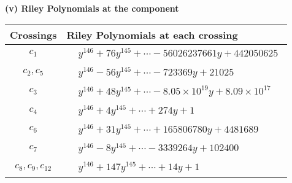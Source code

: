 \documentclass[1p]{elsarticle_modified}
\theoremstyle{definition}
\begin{document}
\newpage\renewcommand{\arraystretch}{1}
\flushleft \textbf{(v) Riley Polynomials at the component}\newline \\
\begin{tabular}{m{50pt}|m{274pt}}
Crossings & \hspace{64pt}Riley Polynomials at each crossing \\
\hline $$\begin{aligned}c_{1}\end{aligned}$$&$\begin{aligned}
&y^{146}+76 y^{145}+\cdots-56026237661 y+442050625
\end{aligned}$\\
\hline $$\begin{aligned}c_{2},c_{5}\end{aligned}$$&$\begin{aligned}
&y^{146}-56 y^{145}+\cdots-723369 y+21025
\end{aligned}$\\
\hline $$\begin{aligned}c_{3}\end{aligned}$$&$\begin{aligned}
&y^{146}+48 y^{145}+\cdots-8.05\times10^{19} y+8.09\times10^{17}
\end{aligned}$\\
\hline $$\begin{aligned}c_{4}\end{aligned}$$&$\begin{aligned}
&y^{146}+4 y^{145}+\cdots+274 y+1
\end{aligned}$\\
\hline $$\begin{aligned}c_{6}\end{aligned}$$&$\begin{aligned}
&y^{146}+31 y^{145}+\cdots+165806780 y+4481689
\end{aligned}$\\
\hline $$\begin{aligned}c_{7}\end{aligned}$$&$\begin{aligned}
&y^{146}-8 y^{145}+\cdots-3339264 y+102400
\end{aligned}$\\
\hline $$\begin{aligned}c_{8},c_{9},c_{12}\end{aligned}$$&$\begin{aligned}
&y^{146}+147 y^{145}+\cdots+14 y+1
\end{aligned}$\\

\end{tabular}
\end{document}
